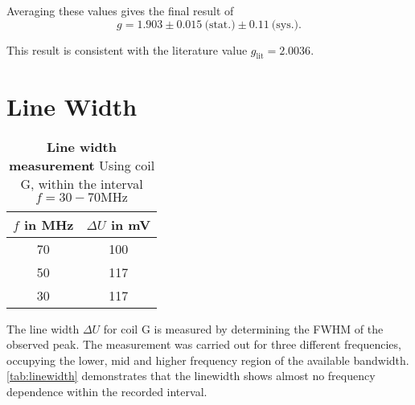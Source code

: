 Averaging these values gives the final result of
\begin{equation*}
	g = \num{1.903}\pm\num{0.015}\ \text{(stat.)}\pm\num{0.11}\ \text{(sys.)}.
\end{equation*}

This result is consistent with the literature value $g_\text{lit}%
=\num{2.0036}$\cite{g-factor}.

\section{Line Width}
\begin{table}[tbp]
	\centering
	\caption[Line width]{\textbf{Line width measurement} Using coil G, within the interval $f=30-70\si{\MHz}$}
	\label{tab:linewidth}
	\begin{tabular}{SS}
		\toprule
		{$f$ in \si{\MHz}}	&	{$\Delta U$ in \si{\mV}}	\\
			&	100	\\
		50	&	117	\\
		30	&	117	\\
		\bottomrule
	\end{tabular}
\end{table}
The line width $\Delta U$ for coil G is measured by determining the FWHM of the observed peak.
The measurement was carried out for three different frequencies, occupying the lower, mid and higher frequency region of the available bandwidth.
\autoref{tab:linewidth} demonstrates that the linewidth shows almost no frequency dependence within the recorded interval.
